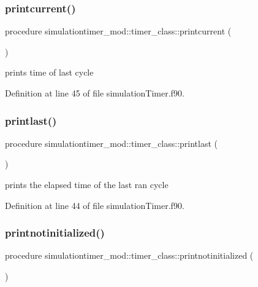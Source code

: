 \subsubsection{\texorpdfstring{printcurrent()}{printcurrent()}}
{\footnotesize\ttfamily procedure simulationtimer\+\_\+mod\+::timer\+\_\+class\+::printcurrent (\begin{DoxyParamCaption}{ }\end{DoxyParamCaption})\hspace{0.3cm}{\ttfamily [private]}}



prints time of last cycle 



Definition at line 45 of file simulation\+Timer.\+f90.

\mbox{\label{structsimulationtimer__mod_1_1timer__class_a1ac8844fe0766c418d301064155d9cc9}} 
\subsubsection{\texorpdfstring{printlast()}{printlast()}}
{\footnotesize\ttfamily procedure simulationtimer\+\_\+mod\+::timer\+\_\+class\+::printlast (\begin{DoxyParamCaption}{ }\end{DoxyParamCaption})\hspace{0.3cm}{\ttfamily [private]}}



prints the elapsed time of the last ran cycle 



Definition at line 44 of file simulation\+Timer.\+f90.

\mbox{\label{structsimulationtimer__mod_1_1timer__class_a559692fe52fabf6a4f5078b03ed08620}} 
\subsubsection{\texorpdfstring{printnotinitialized()}{printnotinitialized()}}
{\footnotesize\ttfamily procedure simulationtimer\+\_\+mod\+::timer\+\_\+class\+::printnotinitialized (\begin{DoxyParamCaption}{ }\end{DoxyParamCaption})\hspace{0.3cm}{\ttfamily [private]}}



